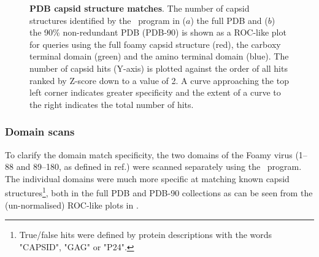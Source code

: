 % 
% 
%
 
\begin{figure}
\centering
{}
\begin{footnotesize}
\caption{
\label{Fig:rocs}
{\bf PDB capsid structure matches}.
The number of capsid structures identified by the \DALI\ program in ($a$) the full PDB and ($b$)
the 90\% non-redundant PDB (PDB-90) is shown as a ROC-like plot for queries using the full foamy capsid
structure (red), the carboxy terminal domain (green) and the amino terminal domain (blue). 
The number of capsid hits (Y-axis) is plotted against the order of all hits ranked by Z-score
down to a value of 2.   A curve approaching the top left corner indicates greater specificity 
and the extent of a curve to the right indicates the total number of hits.
}
\end{footnotesize}
\end{figure}

\subsubsection{Domain scans}

To clarify the domain match specificity, the two domains of the Foamy virus
(1--88 and 89--180, as defined in ref.\cite{TaylorWR99b}) were scanned separately using the \DALI\ program.  
The individual domains were much more specific at matching known capsid structures\footnote{
True/false hits were defined by protein descriptions with the words "CAPSID", "GAG" or "P24".
},   
both in the full PDB and PDB-90 collections as can be seen from the (un-normalised)
ROC-like plots in .

